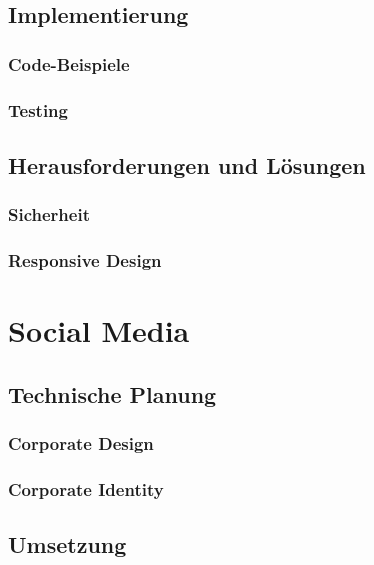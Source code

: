   \subsection{Implementierung}

    \subsubsection{Code-Beispiele}

    \subsubsection{Testing}

  \subsection{Herausforderungen und Lösungen}

    \subsubsection{Sicherheit}

    \subsubsection{Responsive Design}

\section{Social Media}

  \subsection{Technische Planung}

    \subsubsection{Corporate Design}

    \subsubsection{Corporate Identity}

  \subsection{Umsetzung}

